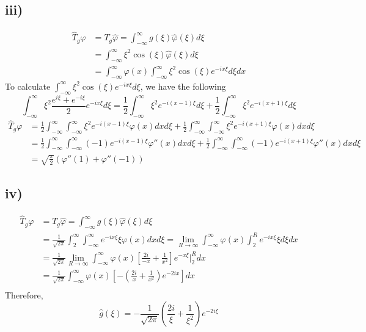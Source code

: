 \documentclass[a4paper, 11pt]{article}
\begin{document}
\begin{spacing}{1.5}
\subsection*{iii)}
\begin{align*}
\hat{T}_g \varphi
	& = T_g \hat{\varphi} = \int_{-\infty}^{\infty}g(\xi)\hat{\varphi}(\xi)d\xi \\ 
	& = \int_{-\infty}^{\infty} \xi^2 \cos(\xi) \hat{\varphi}(\xi)d\xi \\
	& = \int_{-\infty}^{\infty} \varphi(x) \int_{-\infty}^{\infty} \xi^2 \cos(\xi) e^{-ix\xi} d\xi dx
\end{align*}
To calculate $\int_{-\infty}^{\infty} \xi^2 \cos(\xi) e^{-ix\xi} d\xi$, we have the following
$$
\int_{-\infty}^{\infty} \xi^2 \frac{e^{i\xi}+e^{-i\xi}}{2} e^{-ix\xi} d\xi = \frac{1}{2} \int_{-\infty}^{\infty}  \xi^2 e^{-i(x-1)\xi} d\xi + \frac{1}{2} \int_{-\infty}^{\infty}  \xi^2 e^{-i(x+1)\xi} d\xi
$$
\begin{align*}
\hat{T}_g \varphi
	& = \frac{1}{2} \int_{-\infty}^{\infty} \int_{-\infty}^{\infty}  \xi^2 e^{-i(x-1)\xi} \varphi(x) dx d\xi + \frac{1}{2} \int_{-\infty}^{\infty} \int_{-\infty}^{\infty}  \xi^2 e^{-i(x+1)\xi} \varphi(x) dx d\xi \\
	& = \frac{1}{2} \int_{-\infty}^{\infty} \int_{-\infty}^{\infty}  (-1)  e^{-i(x-1)\xi} \varphi''(x) dx d\xi + \frac{1}{2} \int_{-\infty}^{\infty} \int_{-\infty}^{\infty} (-1) e^{-i(x+1)\xi} \varphi''(x) dx d\xi \\
	& = \sqrt{\frac{\pi}{2}} \left(\varphi''(1) + \varphi''(-1)\right)
\end{align*}

\subsection*{iv)}
\begin{align*}
\hat{T}_g \varphi
	& = T_g \hat{\varphi} = \int_{-\infty}^{\infty} g(\xi)\hat{\varphi}(\xi)d\xi \\ 
	& = \frac{1}{\sqrt{2\pi}} \int_{2}^{\infty} \int_{-\infty}^{\infty} e^{-ix\xi} \xi \varphi(x)dx d\xi = \lim\limits_{R\to \infty}\int_{-\infty}^{\infty} \varphi(x)  \int_{2}^{R} e^{-ix\xi}\xi d\xi dx \\
	& = \frac{1}{\sqrt{2\pi}} \lim\limits_{R\to \infty}\int_{-\infty}^{\infty} \varphi(x)  \left[ \frac{2i}{-x} + \frac{1}{x^2} \right] e^{-x\xi} \Big|_2^R dx \\
	& = \frac{1}{\sqrt{2\pi}} \int_{-\infty}^{\infty} \varphi(x)  \left[ - \left( \frac{2i}{x} + \frac{1}{x^2} \right) e^{-2ix}  \right] dx \\
\end{align*}
Therefore,
$$
\hat{g} (\xi) = -\frac{1}{\sqrt{2\pi}} \left( \frac{2i}{\xi} + \frac{1}{\xi^2} \right) e^{-2i\xi}
$$


\end{spacing}
\end{document}
